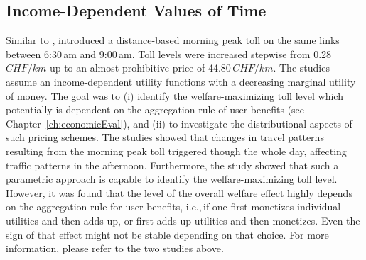 \subsection{Income-Dependent Values of Time}
Similar to \citet{RieserEtAl_TRBTDF_2008}, \citet{KickhoeferEtAl2010EconomicEvaluationPublicAcceptanceRoadPricingKuhmo, Kickhoefer_PhDThesis_2014} introduced a distance-based morning peak toll on the same links between 6:30\,am and 9:00\,am. Toll levels were increased stepwise from 0.28\,$CHF/km$ up to an almost prohibitive price of 44.80\,$CHF/km$. The studies assume an income-dependent utility functions with a decreasing marginal utility of money. The goal was to (i) identify the welfare-maximizing toll level which potentially is dependent on the aggregation rule of user benefits (see Chapter~\ref{ch:economicEval}), and (ii) to investigate the distributional aspects of such pricing schemes.
%
The studies showed that changes in travel patterns resulting from the morning peak toll triggered though the whole day, affecting traffic patterns in the afternoon.
%
Furthermore, the study showed that such a parametric approach is capable to identify the welfare-maximizing toll level. However, it was found that the level of the overall welfare effect highly depends on the aggregation rule for user benefits, i.e.,\,if one first monetizes individual utilities and then adds up, or first adds up utilities and then monetizes. 
Even the sign of that effect might not be stable depending on that choice.
%
For more information, please refer to the two studies above.


